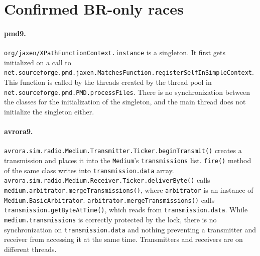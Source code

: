 \documentclass[letter,10pt]{article}
\newcommand{\conflicts}[2]{\ensuremath{#1 \asymp #2}} %
\newcommand{\tr}{\ensuremath{\mathit{tr}}\xspace}
\newcommand{\WDC}{DC\xspace}
\newcommand{\BR}{BR\xspace}
\newcommand{\DC}{\WDC}
\newcommand{\DCOrdered}[2]{\WDCOrdered{#1}{#2}}
\newcommand{\nDCOrdered}[2]{\nWDCOrdered{#1}{#2}}
\newcommand{\ltTR}{\ensuremath{<_\textsc{\tr}}\xspace}
\newcommand{\ltEqTR}{\ensuremath{\leq_\textsc{\tr}}\xspace}
\newcommand{\ltWDC}{\ensuremath{\prec_\textsc{\tiny{\WDC}}}\xspace}
\newcommand{\nltWDC}{\ensuremath{\not\prec_\textsc{\tiny{\WDC}}}\xspace}
\newcommand{\Ordered}[3]{\ensuremath{#1 #2 #3}}
\newcommand{\TROrdered}[2]{\Ordered{#1}{\ltTR}{#2}}
\newcommand{\EqTROrdered}[2]{\Ordered{#1}{\ltEqTR}{#2}}
\newcommand{\WDCOrdered}[2]{\Ordered{#1}{\ltWDC}{#2}}
\newcommand{\nWDCOrdered}[2]{\Ordered{#1}{\nltWDC}{#2}}
\begin{document}



\section{Confirmed \BR-only races}

\paragraph{pmd9.}

\texttt{org/jaxen/XPathFunctionContext.instance} is a singleton. It first gets
initialized on a call to
\texttt{net.sourceforge.pmd.jaxen.MatchesFunction.registerSelfInSimpleContext}.
This function is called by the threads created by the thread pool in
\texttt{net.sourceforge.pmd.PMD.processFiles}. There is no synchronization
between the classes for the initialization of the singleton, and the main thread
does not initialize the singleton either.

\paragraph{avrora9.}

\texttt{avrora.sim.radio.Medium.Transmitter.Ticker.beginTransmit()} creates a
transmission and places it into the \texttt{Medium}'s \texttt{transmissions}
list. \texttt{fire()} method of the same class writes into
\texttt{transmission.data} array.
\texttt{avrora.sim.radio.Medium.Receiver.Ticker.deliverByte()} calls
\texttt{medium.arbitrator.mergeTransmissions()}, where \texttt{arbitrator} is an
instance of \texttt{Medium.BasicArbitrator}.
\texttt{arbitrator.mergeTransmissions()} calls
\texttt{transmission.getByteAtTime()}, which reads from
\texttt{transmission.data}. While \texttt{medium.transmissions} is correctly
protected by the lock, there is no synchronization on \texttt{transmission.data}
and nothing preventing a transmitter and receiver from accessing it at the same
time. Transmitters and receivers are on different threads.
\end{document}
